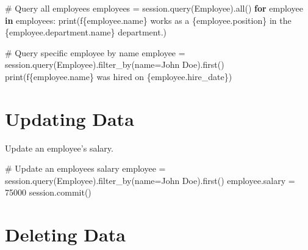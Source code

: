 \documentclass[
  letterpaper,
  DIV=11,
  numbers=noendperiod]{scrreprt}
\newenvironment{Shaded}{\begin{snugshade}}{\end{snugshade}}
\newcommand{\BuiltInTok}[1]{\textcolor[rgb]{0.00,0.23,0.31}{#1}}
\newcommand{\CommentTok}[1]{\textcolor[rgb]{0.37,0.37,0.37}{#1}}
\newcommand{\ControlFlowTok}[1]{\textcolor[rgb]{0.00,0.23,0.31}{\textbf{#1}}}
\newcommand{\DecValTok}[1]{\textcolor[rgb]{0.68,0.00,0.00}{#1}}
\newcommand{\KeywordTok}[1]{\textcolor[rgb]{0.00,0.23,0.31}{\textbf{#1}}}
\newcommand{\NormalTok}[1]{\textcolor[rgb]{0.00,0.23,0.31}{#1}}
\newcommand{\OperatorTok}[1]{\textcolor[rgb]{0.37,0.37,0.37}{#1}}
\newcommand{\SpecialCharTok}[1]{\textcolor[rgb]{0.37,0.37,0.37}{#1}}
\newcommand{\SpecialStringTok}[1]{\textcolor[rgb]{0.13,0.47,0.30}{#1}}
\newcommand{\StringTok}[1]{\textcolor[rgb]{0.13,0.47,0.30}{#1}}
\begin{document}
\begin{Shaded}
\begin{Highlighting}[]
\CommentTok{\# Query all employees}
\NormalTok{employees }\OperatorTok{=}\NormalTok{ session.query(Employee).}\BuiltInTok{all}\NormalTok{()}
\ControlFlowTok{for}\NormalTok{ employee }\KeywordTok{in}\NormalTok{ employees:}
    \BuiltInTok{print}\NormalTok{(}\SpecialStringTok{f\textquotesingle{}}\SpecialCharTok{\{}\NormalTok{employee}\SpecialCharTok{.}\NormalTok{name}\SpecialCharTok{\}}\SpecialStringTok{ works as a }\SpecialCharTok{\{}\NormalTok{employee}\SpecialCharTok{.}\NormalTok{position}\SpecialCharTok{\}}\SpecialStringTok{ in the }\SpecialCharTok{\{}\NormalTok{employee}\SpecialCharTok{.}\NormalTok{department}\SpecialCharTok{.}\NormalTok{name}\SpecialCharTok{\}}\SpecialStringTok{ department.\textquotesingle{}}\NormalTok{)}

\CommentTok{\# Query specific employee by name}
\NormalTok{employee }\OperatorTok{=}\NormalTok{ session.query(Employee).filter\_by(name}\OperatorTok{=}\StringTok{\textquotesingle{}John Doe\textquotesingle{}}\NormalTok{).first()}
\BuiltInTok{print}\NormalTok{(}\SpecialStringTok{f\textquotesingle{}}\SpecialCharTok{\{}\NormalTok{employee}\SpecialCharTok{.}\NormalTok{name}\SpecialCharTok{\}}\SpecialStringTok{ was hired on }\SpecialCharTok{\{}\NormalTok{employee}\SpecialCharTok{.}\NormalTok{hire\_date}\SpecialCharTok{\}}\SpecialStringTok{\textquotesingle{}}\NormalTok{)}
\end{Highlighting}
\end{Shaded}

\section{Updating Data}\label{updating-data-1}

Update an employee's salary.

\begin{Shaded}
\begin{Highlighting}[]
\CommentTok{\# Update an employee\textquotesingle{}s salary}
\NormalTok{employee }\OperatorTok{=}\NormalTok{ session.query(Employee).filter\_by(name}\OperatorTok{=}\StringTok{\textquotesingle{}John Doe\textquotesingle{}}\NormalTok{).first()}
\NormalTok{employee.salary }\OperatorTok{=} \DecValTok{75000}
\NormalTok{session.commit()}
\end{Highlighting}
\end{Shaded}

\section{Deleting Data}\label{deleting-data-1}
\end{document}
